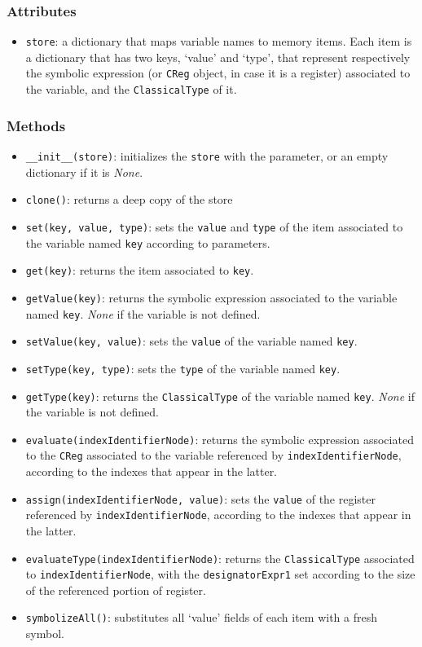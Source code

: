 \documentclass[12pt,a4paper]{report}
\theoremstyle{definition}
\theoremstyle{definition}
\theoremstyle{definition}
\begin{document}
\subsubsection{Attributes}
\begin{itemize}
    \itemsep 0em
    \item \texttt{store}: a dictionary that maps variable names to memory items. Each item is a dictionary that has two keys, `value' and `type', that represent respectively the symbolic expression (or \texttt{CReg} object, in case it is a register) associated to the variable, and the \texttt{ClassicalType} of it.
\end{itemize}
\subsubsection{Methods}
\begin{itemize}
    \itemsep 0em
    \item \texttt{\_\_init\_\_(store)}: initializes the \texttt{store} with the parameter, or an empty dictionary if it is \textit{None}.
    \item \texttt{clone()}: returns a deep copy of the store
    \item \texttt{set(key, value, type)}: sets the \texttt{value} and \texttt{type} of the item associated to the variable named \texttt{key} according to parameters.
    \item \texttt{get(key)}: returns the item associated to \texttt{key}.
    \item \texttt{getValue(key)}: returns the symbolic expression associated to the variable named \texttt{key}. \textit{None} if the variable is not defined.
    \item \texttt{setValue(key, value)}: sets the \texttt{value} of the variable named \texttt{key}.
    \item \texttt{setType(key, type)}: sets the \texttt{type} of the variable named \texttt{key}.
    \item \texttt{getType(key)}: returns the \texttt{ClassicalType} of the variable named \texttt{key}. \textit{None} if the variable is not defined.
    \item \texttt{evaluate(indexIdentifierNode)}: returns the symbolic expression associated to the \texttt{CReg} associated to the variable referenced by \texttt{indexIdentifierNode}, according to the indexes that appear in the latter.
    \item \texttt{assign(indexIdentifierNode, value)}: sets the \texttt{value} of the register referenced by \texttt{indexIdentifierNode}, according to the indexes that appear in the latter.
    \item \texttt{evaluateType(indexIdentifierNode)}: returns the \texttt{ClassicalType} associated to \texttt{indexIdentifierNode}, with the \texttt{designatorExpr1} set according to the size of the referenced portion of register.
    \item \texttt{symbolizeAll()}: substitutes all `value' fields of each item with a fresh symbol.
\end{itemize}
\end{document}

